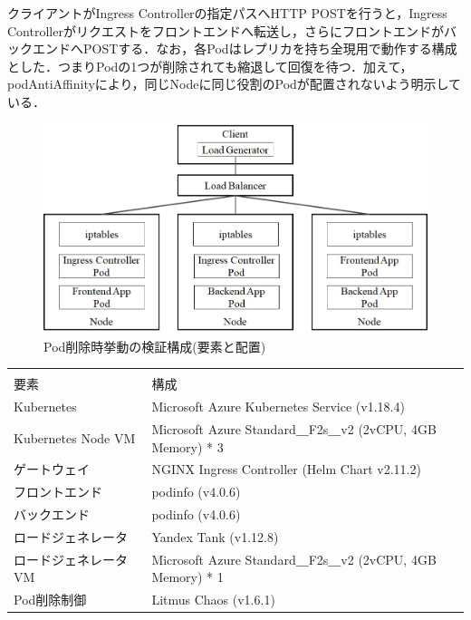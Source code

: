 \documentclass[12pt,a4j]{ujreport}
\begin{document}
クライアントがIngress Controllerの指定パスへHTTP POSTを行うと，Ingress Controllerがリクエストをフロントエンドへ転送し，さらにフロントエンドがバックエンドへPOSTする．なお，各Podはレプリカを持ち全現用で動作する構成とした．つまりPodの1つが削除されても縮退して回復を待つ．加えて，podAntiAffinityにより，同じNodeに同じ役割のPodが配置されないよう明示している．
\newpage
\begin{figure}[tb]
    \centerline{\includegraphics[clip,width=140mm]{images/exp-overall.jpg}}
    \caption{Pod削除時挙動の検証構成(要素と配置)}\label{fig10}
\end{figure}

\begin{footnotesize}
    \begin{tabularx}{\linewidth}{
            >{\hsize=0.8\hsize}X|
            >{\hsize=1.2\hsize}X
        }
        \captionsetup{font=normalsize}
        \caption{Pod削除時挙動の検証環境}\label{table5}                      \\
        要素                  & 構成                                                      \\ \hline \hline
        Kubernetes            & Microsoft Azure Kubernetes Service (v1.18.4)              \\ \hline
        Kubernetes Node VM    & Microsoft Azure Standard＿F2s＿v2 (2vCPU, 4GB Memory) * 3 \\ \hline
        ゲートウェイ          & NGINX Ingress Controller (Helm Chart v2.11.2)             \\ \hline
        フロントエンド        & podinfo (v4.0.6)                                          \\ \hline
        バックエンド          & podinfo (v4.0.6)                                          \\ \hline
        ロードジェネレータ    & Yandex Tank (v1.12.8)                                     \\ \hline
        ロードジェネレータ VM & Microsoft Azure Standard＿F2s＿v2 (2vCPU, 4GB Memory) * 1 \\ \hline
        Pod削除制御 & Litmus Chaos (v1.6.1) \\ \hline
    \end{tabularx}
\end{footnotesize}
\end{document}
